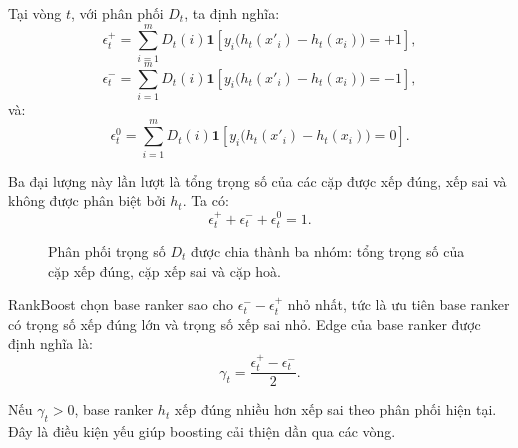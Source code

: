 Tại vòng \(t\), với phân phối \(D_t\), ta định nghĩa:
\begin{equation}
    \epsilon_t^{+}
    =
    \sum_{i=1}^{m}
    D_t(i)
    \mathbf{1}
    \left[
        y_i\big(h_t(x'_i)-h_t(x_i)\big)=+1
    \right],
    \label{eq:section5-epsilon-plus}
\end{equation}
\begin{equation}
    \epsilon_t^{-}
    =
    \sum_{i=1}^{m}
    D_t(i)
    \mathbf{1}
    \left[
        y_i\big(h_t(x'_i)-h_t(x_i)\big)=-1
    \right],
    \label{eq:section5-epsilon-minus}
\end{equation}
và:
\begin{equation}
    \epsilon_t^{0}
    =
    \sum_{i=1}^{m}
    D_t(i)
    \mathbf{1}
    \left[
        y_i\big(h_t(x'_i)-h_t(x_i)\big)=0
    \right].
    \label{eq:section5-epsilon-zero}
\end{equation}

Ba đại lượng này lần lượt là tổng trọng số của các cặp được xếp đúng, xếp sai và không được phân biệt bởi \(h_t\). Ta có:
\[
    \epsilon_t^{+}
    +
    \epsilon_t^{-}
    +
    \epsilon_t^{0}
    =
    1.
\]

\begin{figure}[H]
    \centering
    \caption{Phân phối trọng số \(D_t\) được chia thành ba nhóm: tổng trọng số của cặp xếp đúng, cặp xếp sai và cặp hoà.}
    \label{fig:section5-epsilon-decomposition}
\end{figure}

RankBoost chọn base ranker sao cho \(\epsilon_t^{-}-\epsilon_t^{+}\) nhỏ nhất, tức là ưu tiên base ranker có trọng số xếp đúng lớn và trọng số xếp sai nhỏ. Edge của base ranker được định nghĩa là:
\begin{equation}
    \gamma_t
    =
    \frac{\epsilon_t^{+}-\epsilon_t^{-}}{2}.
    \label{eq:section5-edge}
\end{equation}

Nếu \(\gamma_t>0\), base ranker \(h_t\) xếp đúng nhiều hơn xếp sai theo phân phối hiện tại. Đây là điều kiện yếu giúp boosting cải thiện dần qua các vòng.

